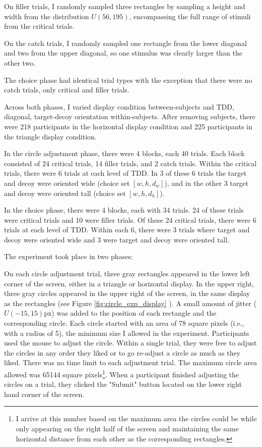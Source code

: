 {{On filler trials, I randomly sampled three rectangles by sampling a height and width from the distribution $U(56,195)$, encompassing the full range of stimuli from the critical trials.

On the catch trials, I randomly sampled one rectangle from the lower diagonal and two from the upper diagonal, so one stimulus was clearly larger than the other two.

The choice phase had identical trial types with the exception that there were no catch trials, only critical and filler trials.

Across both phases, I varied display condition between-subjects and TDD, diagonal, target-decoy orientation within-subjects. After removing subjects, there were 218 participants in the horizontal display condition and 225 participants in the triangle display condition. 

In the circle adjustment phase, there were 4 blocks, each 40 trials. Each block consisted of 24 critical trials, 14 filler trials, and 2 catch trials. Within the critical trials, there were 6 trials at each level of TDD. In 3 of these 6 trials the target and decoy were oriented wide (choice set $[w,h,d_{w}]$), and in the other 3 target and decoy were oriented tall (choice set $[w,h,d_{h}]$). 

In the choice phase, there were 4 blocks, each with 34 trials. 24 of these trials were critical trials and 10 were filler trials. Of these 24 critical trials, there were 6 trials at each level of TDD. Within each 6, there were 3 trials where target and decoy were oriented wide and 3 were target and decoy were oriented tall. 


The experiment took place in two phases: 

On each circle adjustment trial, three gray rectangles appeared in the lower left corner of the screen, either in a triangle or horizontal display. In the upper right, three gray circles appeared in the upper right of the screen, in the same display as the rectangles (see Figure \ref{fig:circle_exp_display} ). A small amount of jitter ($U(-15,15)\text{px}$) was added to the position of each rectangle and the corresponding circle. Each circle started with an area of 78 square pixels (i.e., with a radius of 5), the minimum size I allowed in the experiment. Participants used the mouse to adjust the circle. Within a single trial, they were free to adjust the circles in any order they liked or to go re-adjust a circle as much as they liked. There was no time limit to each adjustment trial. The maximum circle area allowed was 65144 square pixels\footnote{I arrive at this number based on the maximum area the circles could be while only appearing on the right half of the screen and maintaining the same horizontal distance from each other as the corresponding rectangles.}. When a participant finished adjusting the circles on a trial, they clicked the "Submit" button located on the lower right hand corner of the screen. 

}}
